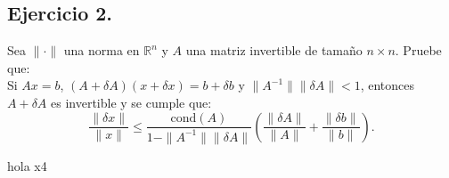 
\subsection*{Ejercicio 2.}
Sea $\| \cdot \|$ una norma en $\mathbb{R}^n$ y $A$ una matriz invertible de tamaño $n \times n$. Pruebe que:\\

Si $Ax = b$, $(A + \delta A)(x + \delta x) = b + \delta b$ y $\|A^{-1}\| \|\delta A\| < 1$, entonces $A + \delta A$ es invertible y se cumple que:
\[
\frac{\|\delta x\|}{\|x\|} \leq \frac{\text{cond}(A)}{1 - \|A^{-1}\| \|\delta A\|} \left( \frac{\|\delta A\|}{\|A\|} + \frac{\|\delta b\|}{\|b\|} \right).
\]

\begin{sproof}
    hola x4
\end{sproof}